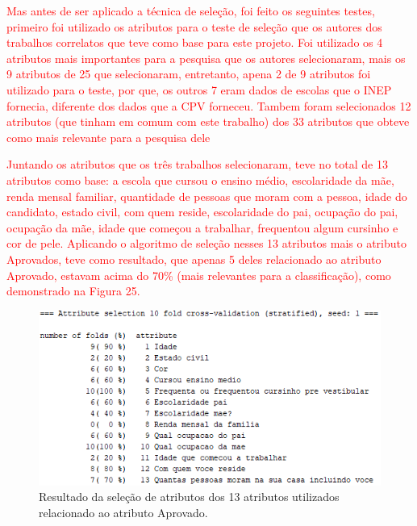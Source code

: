 \par
\textcolor{red}{}



\par
\textcolor{red}{Mas antes de ser aplicado a técnica de seleção, foi feito os seguintes testes, primeiro foi utilizado os atributos para o teste de seleção que os autores dos trabalhos correlatos que teve como base para este projeto. Foi utilizado os 4 atributos mais importantes para a pesquisa que os autores  selecionaram, mais os 9 atributos de 25 que  selecionaram, entretanto, apena 2 de 9 atributos foi utilizado para o teste, por que, os outros 7 eram dados de escolas que o INEP fornecia, diferente dos dados que a CPV forneceu. Tambem foram selecionados 12 atributos (que tinham em comum com este trabalho) dos 33 atributos que  obteve como mais relevante para a pesquisa dele}


\par
\textcolor{red}{Juntando os atributos que os três trabalhos selecionaram, teve no total de 13 atributos como base: a escola que cursou o ensino médio, escolaridade da mãe, renda mensal familiar, quantidade de pessoas que moram com a pessoa, idade do candidato, estado civil, com quem reside, escolaridade do pai, ocupação do pai, ocupação da mãe, idade que começou a trabalhar, frequentou algum cursinho e cor de pele. Aplicando o algoritmo de seleção nesses 13 atributos mais o atributo Aprovados, teve como resultado, que apenas 5 deles relacionado ao atributo Aprovado, estavam acima do 70\%  (mais relevantes para a classificação), como demonstrado na Figura 25.}

\par
\begin{figure}[!htp]
	\begin{center}
    \caption{\label{fig:waveform_fig} Resultado da seleção de atributos dos 13 atributos utilizados relacionado ao atributo Aprovado.}
	\includegraphics[scale=0.99]{Figuras/13_atributos.png}
	\end{center}
\end{figure}

